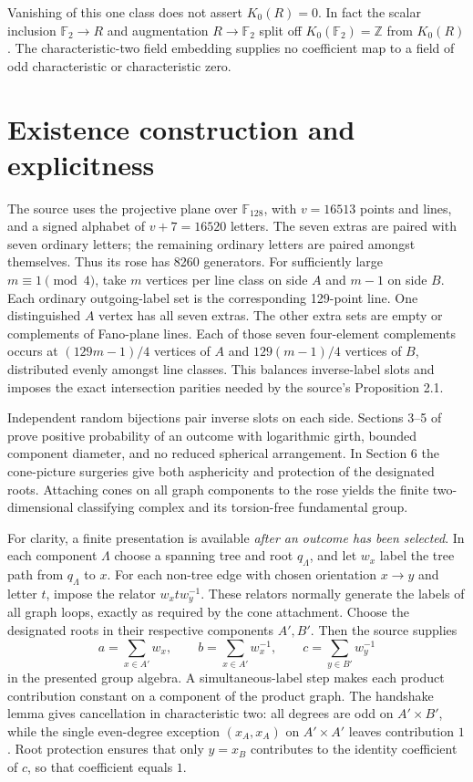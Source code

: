 \documentclass[11pt]{article}
\newcommand{\Ftwo}{\mathbb F_2}
\begin{document}
Vanishing of this one class does not assert $K_0(R)=0$. In fact the
scalar inclusion $\Ftwo\to R$ and augmentation $R\to\Ftwo$ split off
$K_0(\Ftwo)=\mathbb Z$ from $K_0(R)$. The characteristic-two field
embedding supplies no coefficient map to a field of odd characteristic
or characteristic zero.

\section{Existence construction and explicitness}\label{sec:input-audit}
The source uses the projective plane over $\mathbb F_{128}$, with
$v=16513$ points and lines, and a signed alphabet of $v+7=16520$ letters.
The seven extras are paired with seven ordinary letters; the remaining
ordinary letters are paired amongst themselves. Thus its rose has 8260
generators. For sufficiently large $m\equiv1\pmod4$, take $m$ vertices
per line class on side $A$ and $m-1$ on side $B$.
Each ordinary outgoing-label set is the corresponding 129-point line.
One distinguished $A$ vertex has all seven extras. The other extra sets
are empty or complements of Fano-plane lines. Each of those seven
four-element complements occurs at $(129m-1)/4$ vertices of $A$ and
$129(m-1)/4$ vertices of $B$, distributed evenly amongst line classes.
This balances inverse-label slots and imposes the exact intersection
parities needed by the source's Proposition 2.1.

Independent random bijections pair inverse slots on each side. Sections
3--5 of \cite{OpenAI} prove positive probability of an outcome with
logarithmic girth, bounded component diameter, and no reduced spherical
arrangement. In Section 6 the cone-picture surgeries give both
asphericity and protection of the designated roots. Attaching cones on
all graph components to the rose yields the finite two-dimensional
classifying complex and its torsion-free fundamental group.

For clarity, a finite presentation is available \emph{after an outcome
has been selected}. In each component $\Lambda$ choose a spanning tree
and root $q_\Lambda$, and let $w_x$ label the tree path from $q_\Lambda$
to $x$. For each non-tree edge with chosen orientation $x\to y$ and
letter $t$, impose the relator $w_x t w_y^{-1}$. These relators normally
generate the labels of all graph loops, exactly as required by the cone
attachment. Choose the designated roots in their respective components
$A',B'$. Then the source supplies
\[
a=\sum_{x\in A'}w_x,\qquad b=\sum_{x\in A'}w_x^{-1},\qquad
c=\sum_{y\in B'}w_y^{-1}
\]
in the presented group algebra. A simultaneous-label step makes each
product contribution constant on a component of the product graph.
The handshake lemma gives cancellation in characteristic two: all
degrees are odd on $A'\times B'$, while the single even-degree exception
$(x_A,x_A)$ on $A'\times A'$ leaves contribution $1$.
Root protection ensures that only $y=x_B$ contributes to the identity
coefficient of $c$, so that coefficient equals $1$.
\end{document}
